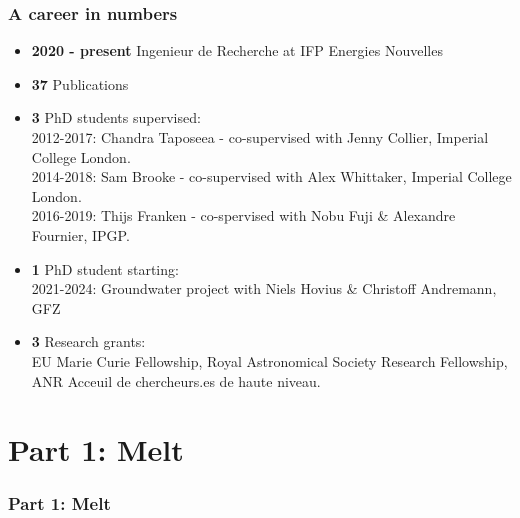 \documentclass[aspectratio=169]{beamer}
\begin{document}
\begin{frame}
    \frametitle{A career in numbers}
    \begin{itemize}
        \item{{\bf 2020 - present} Ingenieur de Recherche at IFP Energies Nouvelles}
        \item{{\bf37} Publications}
        \item{{\bf3} PhD students supervised: \\
              2012-2017: Chandra Taposeea - co-supervised with Jenny Collier, Imperial College London. \\
              2014-2018: Sam Brooke - co-supervised with Alex Whittaker, Imperial College London. \\
              2016-2019: Thijs Franken - co-spervised with Nobu Fuji \& Alexandre Fournier, IPGP.}
        \item{{\bf1} PhD student starting: \\
              2021-2024: Groundwater project with Niels Hovius \& Christoff Andremann, GFZ}
        \item{{\bf3} Research grants: \\
              EU Marie Curie Fellowship, Royal Astronomical Society Research Fellowship, ANR Acceuil de chercheurs.es de haute niveau.}
    \end{itemize}
\end{frame}

\section{Part 1: Melt}

{
\begin{frame}
    \frametitle{Part 1: Melt}
\end{frame}
}
\end{document}
